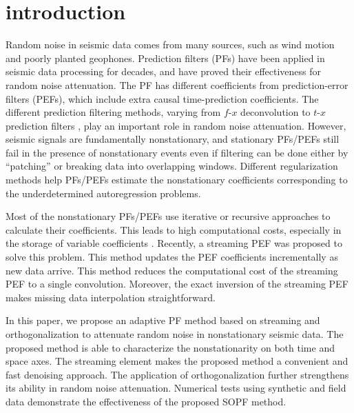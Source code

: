 \section{introduction}
Random noise in seismic data comes from many sources, such as wind
motion and poorly planted geophones. Prediction filters (PFs) have
been applied in seismic data processing for decades, and have proved
their effectiveness for random noise attenuation. The PF has different
coefficients from prediction-error filters (PEFs), which include extra
causal time-prediction coefficients. The different prediction
filtering methods, varying from $f$-$x$ deconvolution
\cite[]{Canales84} to $t$-$x$ prediction filters
\cite[]{Claerbout92,Abma95}, play an important role in random noise
attenuation. However, seismic signals are fundamentally nonstationary,
and stationary PFs/PEFs still fail in the presence of nonstationary
events even if filtering can be done either by ``patching'' or
breaking data into overlapping windows. Different regularization
methods \cite[]{Crawley99,Curry03,Fomel09,Liu13,Liu15} help PFs/PEFs
estimate the nonstationary coefficients corresponding to the
underdetermined autoregression problems.

Most of the nonstationary PFs/PEFs use iterative or recursive
approaches to calculate their coefficients. This leads to high
computational costs, especially in the storage
of variable coefficients \cite[]{Ruan15}. Recently, a streaming PEF
\cite[]{Fomel16} was proposed to solve this problem. 
This method updates the PEF coefficients incrementally as new data
arrive. This method reduces the computational 
cost of the streaming PEF to a single convolution. Moreover, the exact
inversion of the streaming PEF makes missing data interpolation
straightforward.

In this paper, we propose an adaptive PF method based on streaming and
orthogonalization \cite[]{Chen15} to attenuate random noise in
nonstationary seismic data. The proposed method is able to
characterize the nonstationarity on both time and space axes. The
streaming element makes the proposed method a convenient and fast
denoising approach. The application of orthogonalization further
strengthens its ability in random noise attenuation. Numerical tests
using synthetic and field data demonstrate the effectiveness of the
proposed SOPF method.

